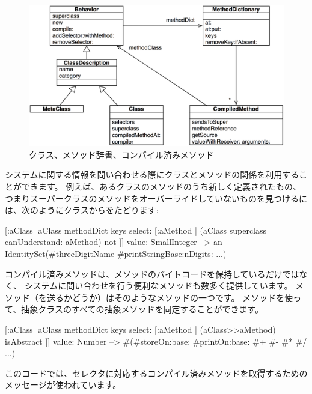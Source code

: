 \documentclass[a4paper,10pt,twoside]{book}
\begin{document}
\begin{figure}[ht]\centering
	\includegraphics[width=\linewidth]{MethodsAsObjects}
	\caption{クラス、メソッド辞書、コンパイル済みメソッド}
\end{figure}

システムに関する情報を問い合わせる際にクラスとメソッドの関係を利用することができます。
例えば、あるクラスのメソッドのうち新しく定義されたもの、つまりスーパークラスのメソッドをオーバーライドしていないものを見つけるには、次のようにクラスからをたどります:
\begin{code}{}
[:aClass| aClass methodDict keys select: [:aMethod |
  (aClass superclass canUnderstand: aMethod) not ]] value: SmallInteger
  --> an IdentitySet(#threeDigitName #printStringBase:nDigits: ...)
\end{code}

コンパイル済みメソッドは、メソッドのバイトコードを保持しているだけではなく、
システムに問い合わせを行う便利なメソッドも数多く提供しています。
メソッド（を送るかどうか）はそのようなメソッドの一つです。
メソッドを使って、抽象クラスのすべての抽象メソッドを同定することができます。
\begin{code}{}
[:aClass| aClass methodDict keys select: [:aMethod |
  (aClass>>aMethod) isAbstract ]] value: Number
  --> #(#storeOn:base: #printOn:base: #+ #- #* #/ ...)
\end{code}
このコードでは、セレクタに対応するコンパイル済みメソッドを取得するための\ct{>>}メッセージが使われています。

\end{document}
